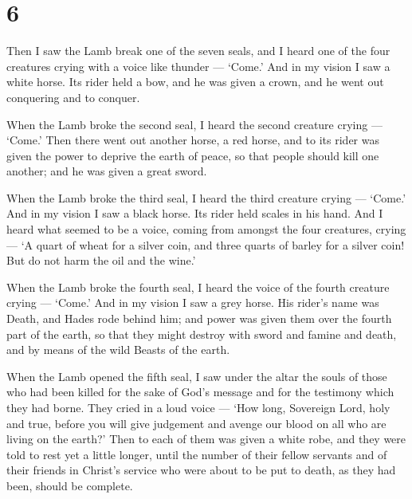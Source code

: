 \hypertarget{section-5}{%
\section{6}\label{section-5}}

 Then I saw the Lamb break one of the seven seals, and I
heard one of the four creatures crying with a voice like thunder ---
`Come.'  And in my vision I saw a white horse. Its rider
held a bow, and he was given a crown, and he went out conquering and to
conquer.

 When the Lamb broke the second seal, I heard the second
creature crying --- `Come.'  Then there went out another
horse, a red horse, and to its rider was given the power to deprive the
earth of peace, so that people should kill one another; and he was given
a great sword.

 When the Lamb broke the third seal, I heard the third
creature crying --- `Come.' And in my vision I saw a black horse. Its
rider held scales in his hand.  And I heard what seemed to
be a voice, coming from amongst the four creatures, crying --- `A quart
of wheat for a silver coin, and three quarts of barley for a silver
coin! But do not harm the oil and the wine.'

 When the Lamb broke the fourth seal, I heard the voice of
the fourth creature crying --- `Come.'  And in my vision I
saw a grey horse. His rider's name was Death, and Hades rode behind him;
and power was given them over the fourth part of the earth, so that they
might destroy with sword and famine and death, and by means of the wild
Beasts of the earth.

 When the Lamb opened the fifth seal, I saw under the altar
the souls of those who had been killed for the sake of God's message and
for the testimony which they had borne.  They cried in a
loud voice --- `How long, Sovereign Lord, holy and true, before you will
give judgement and avenge our blood on all who are living on the earth?'
 Then to each of them was given a white robe, and they were
told to rest yet a little longer, until the number of their fellow
servants and of their friends in Christ's service who were about to be
put to death, as they had been, should be complete.

